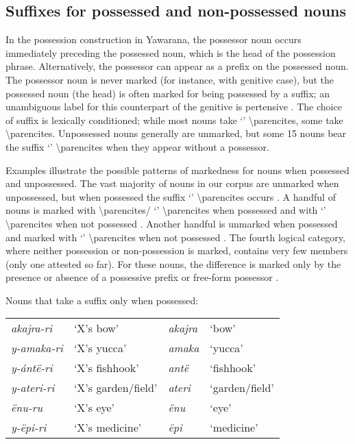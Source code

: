\documentclass{memoir}
\begin{document}
\subsection{\texorpdfstring{Suffixes for possessed and non-possessed
nouns
\label{sec:nounposssuf}}{Suffixes for possessed and non-possessed nouns }}

In the possession construction in Yawarana, the possessor noun occurs
immediately preceding the possessed noun, which is the head of the
possession phrase. Alternatively, the possessor can appear as a prefix
on the possessed noun. The possessor noun is never marked (for instance,
with genitive case), but the possessed noun (the head) is often marked
for being possessed by a suffix; an unambiguous label for this
counterpart of the genitive is pertensive \parencites{dixon2010basic}.
The choice of suffix is lexically conditioned; while most nouns take
 `' \textbackslash parencites, some take 
\textbackslash parencites. Unpossessed nouns generally are unmarked, but
some 15 nouns bear the suffix  `'
\textbackslash parencites when they appear without a possessor.

Examples  illustrate the
possible patterns of markedness for nouns when possessed and
unpossessed. The vast majority of nouns in our corpus are unmarked when
unpossessed, but when possessed the suffix  `'
\textbackslash parencites occurs . A handful of
nouns is marked with  \textbackslash parencites/
`' \textbackslash parencites when possessed and with 
`' \textbackslash parencites when not possessed
. Another handful is unmarked when possessed and
marked with  `' \textbackslash parencites when not
possessed . The fourth logical category, where
neither possession or non-possession is marked, contains very few
members (only one attested so far). For these nouns, the difference is
marked only by the presence or absence of a possessive prefix or
free-form possessor .

\ex\label{onlypossessed} Nouns that take a suffix only when possessed:

\begin{tabular}[t]{llll}

 \emph{akajra-ri} &          ‘X’s bow’ & \emph{akajra} &          ‘bow’ \\

\emph{y-amaka-ri} &        ‘X’s yucca’ &  \emph{amaka} &        ‘yucca’ \\
 \emph{y-ántë-ri} &     ‘X’s fishhook’ &   \emph{antë} &     ‘fishhook’ \\
\emph{y-ateri-ri} & ‘X’s garden/field’ &  \emph{ateri} & ‘garden/field’ \\
    \emph{ënu-ru} &          ‘X’s eye’ &    \emph{ënu} &          ‘eye’ \\
  \emph{y-ëpi-ri} &     ‘X’s medicine’ &    \emph{ëpi} &     ‘medicine’ \\

\end{tabular}
 \xe
\end{document}
